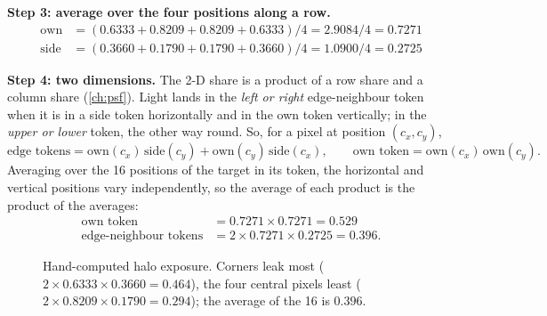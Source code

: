 \documentclass[11pt,a4paper,oneside,openany]{book}
\begin{document}
\textbf{Step 3: average over the four positions along a row.}
\begin{align*}
\text{own} &= (0.6333+0.8209+0.8209+0.6333)/4=2.9084/4=0.7271\\
\text{side} &= (0.3660+0.1790+0.1790+0.3660)/4=1.0900/4=0.2725
\end{align*}

\textbf{Step 4: two dimensions.} The 2-D share is a product of a row share and a column share (\cref{ch:psf}). Light lands in the \emph{left or right}
edge-neighbour token when it is in a side token horizontally and in the own token vertically; in the \emph{upper or lower} token, the other way round.
So, for a pixel at position $(c_x,c_y)$,
\[
  \text{edge tokens}=\text{own}(c_x)\,\text{side}(c_y)+\text{own}(c_y)\,\text{side}(c_x),\qquad \text{own token}=\text{own}(c_x)\,\text{own}(c_y).
\]
Averaging over the 16 positions of the target in its token, the horizontal and vertical positions vary independently, so the average of each product is
the product of the averages:
\begin{align*}
\text{own token} &= 0.7271\times0.7271=0.529\\
\text{edge-neighbour tokens} &= 2\times0.7271\times0.2725=0.396 .
\end{align*}

\begin{figure}[ht]
\centering
{}
\caption{Hand-computed halo exposure. Corners leak most ($2\times0.6333\times0.3660=0.464$), the four central pixels least ($2\times0.8209\times0.1790=0.294$); the
average of the 16 is $0.396$.}
\label{fig:halogrid}
\end{figure}
\end{document}
